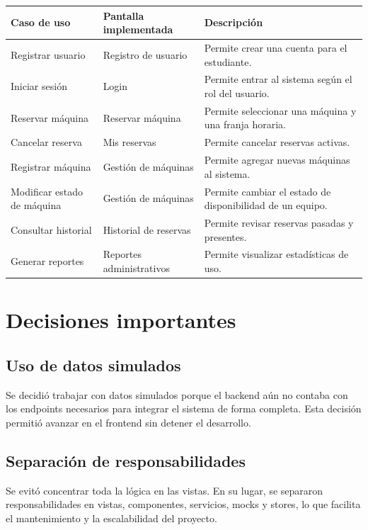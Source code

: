 \documentclass[12pt]{article}
\begin{document}
\begin{longtable}{|p{4cm}|p{4cm}|p{6cm}|}
\hline
\textbf{Caso de uso} & \textbf{Pantalla implementada} & \textbf{Descripción} \\
\hline
Registrar usuario & Registro de usuario & Permite crear una cuenta para el estudiante. \\
\hline
Iniciar sesión & Login & Permite entrar al sistema según el rol del usuario. \\
\hline
Reservar máquina & Reservar máquina & Permite seleccionar una máquina y una franja horaria. \\
\hline
Cancelar reserva & Mis reservas & Permite cancelar reservas activas. \\
\hline
Registrar máquina & Gestión de máquinas & Permite agregar nuevas máquinas al sistema. \\
\hline
Modificar estado de máquina & Gestión de máquinas & Permite cambiar el estado de disponibilidad de un equipo. \\
\hline
Consultar historial & Historial de reservas & Permite revisar reservas pasadas y presentes. \\
\hline
Generar reportes & Reportes administrativos & Permite visualizar estadísticas de uso. \\
\hline
\end{longtable}

\section{Decisiones importantes}

\subsection{Uso de datos simulados}

Se decidió trabajar con datos simulados porque el backend aún no contaba con los endpoints necesarios para integrar el sistema de forma completa. Esta decisión permitió avanzar en el frontend sin detener el desarrollo.

\subsection{Separación de responsabilidades}

Se evitó concentrar toda la lógica en las vistas. En su lugar, se separaron responsabilidades en vistas, componentes, servicios, mocks y stores, lo que facilita el mantenimiento y la escalabilidad del proyecto.
\end{document}
